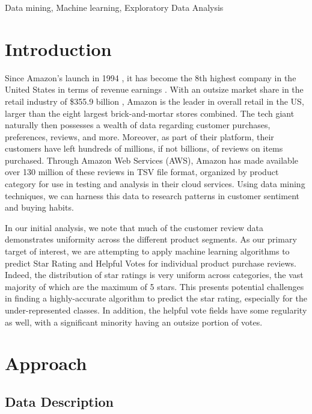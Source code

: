 \documentclass[10pt, conference, compsocconf]{IEEEtran}
\begin{document}
\begin{IEEEkeywords}
Data mining, Machine learning, Exploratory Data Analysis
\end{IEEEkeywords}

\section{Introduction}\label{intro}

Since Amazon’s launch in 1994 \cite{bezos}, it has become the 8th highest company in the United States in terms of revenue earnings \cite{fortune}.  With an outsize market share in the retail industry of \$355.9 billion \cite{visual}, Amazon is the leader in overall retail in the US, larger than the eight largest brick-and-mortar stores combined. The tech giant naturally then possesses a wealth of data regarding customer purchases, preferences, reviews, and more. Moreover, as part of their platform, their customers have left hundreds of millions, if not billions, of reviews on items purchased. Through Amazon Web Services (AWS), Amazon has made available over 130 million of these reviews in TSV file format, organized by product category for use in testing and analysis in their cloud services. Using data mining techniques, we can harness this data to research patterns in customer sentiment and buying habits.

In our initial analysis, we note that much of the customer review data demonstrates uniformity across the different product segments. As our primary target of interest, we are attempting to apply machine learning algorithms to predict Star Rating and Helpful Votes for individual product purchase reviews. Indeed, the distribution of star ratings is very uniform across categories, the vast majority of which are the maximum of 5 stars. This presents potential challenges in finding a highly-accurate algorithm to predict the star rating, especially for the under-represented classes. In addition, the helpful vote fields have some regularity as well, with a significant minority having an outsize portion of votes.


\section{Approach}\label{approach}

\subsection{Data Description} 
\end{document}
